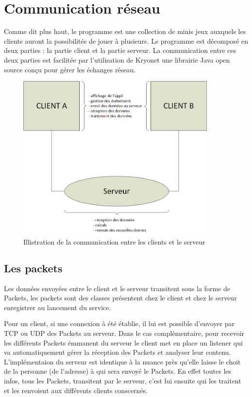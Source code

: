 \documentclass{report}
\begin{document}
\chapter{Communication réseau}
Comme dit plus haut, le programme est une collection de minis jeux auxquels les clients auront la possibilités de jouer à
plusieurs. Le programme est décomposé en deux parties : la partie client et la partie serveur. La communication entre ces
deux parties est facilitée par l'utilisation de Kryonet une librairie Java open source conçu pour gérer les échanges réseau.

\begin{figure}[H]
	\centering\includegraphics[width=10cm]{maquette_Base}
	\caption{Illistration de la communication entre les clients et le serveur}
\end{figure}


\section{Les packets}
Les données envoyées entre le client et le serveur transitent sous la forme de Packets, les packets sont des classes présentent
chez le client et chez le serveur enregistrer au lancement du service.

Pour un client, si une connexion à été établie, il lui est possible d'envoyer par
TCP ou UDP des Packets au serveur. Dans le cas complémentaire,
pour recevoir les différents Packets émmanent du serveur le client met en place
un listener qui va automatiquement gérer la réception des Packets et analyser leur contenu.
L'implémentaion du serveur est identique à la nuance près qu'elle laisse le choit
de la personne (de l'adresse) à qui sera envoyé le Packets. En effet toutes les infos, tous les Packets,
transitent par le serveur, c'est lui ensuite qui les traitent et les renvoient aux différents clients conscernés.
\end{document}
